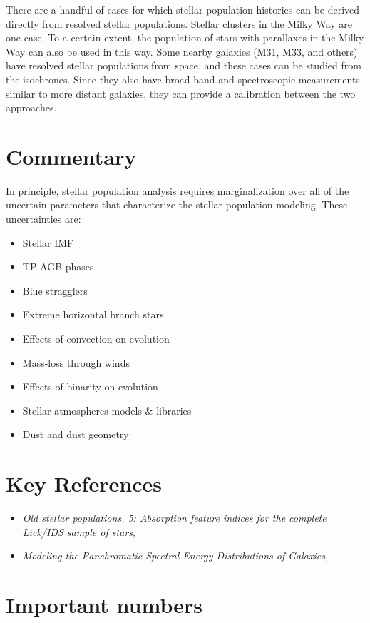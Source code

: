 There are a handful of cases for which stellar population histories
can be derived directly from resolved stellar populations. Stellar
clusters in the Milky Way are one case. To a certain extent, the
population of stars with parallaxes in the Milky Way can also be used
in this way. Some nearby galaxies (M31, M33, and others) have resolved
stellar populations from space, and these cases can be studied from
the isochrones. Since they also have broad band and spectroscopic
measurements similar to more distant galaxies, they can provide a
calibration between the two approaches.

\section{Commentary}

In principle, stellar population analysis requires marginalization
over all of the uncertain parameters that characterize the stellar
population modeling. These uncertainties are:
\begin{itemize}
\item Stellar IMF
\item TP-AGB phases
\item Blue stragglers
\item Extreme horizontal branch stars
\item Effects of convection on evolution
\item Mass-loss through winds
\item Effects of binarity on evolution
\item Stellar atmospheres models \& libraries
\item Dust and dust geometry
\end{itemize}

\section{Key References}

\begin{itemize}
  \item
    {\it Old stellar populations. 5: Absorption feature indices for
    the complete {L}ick/{IDS} sample of stars}, \citet{worthey94}
  \item
    {\it Modeling the Panchromatic Spectral Energy Distributions of Galaxies}, \citet{conroy13a}
\end{itemize}

\section{Important numbers}


